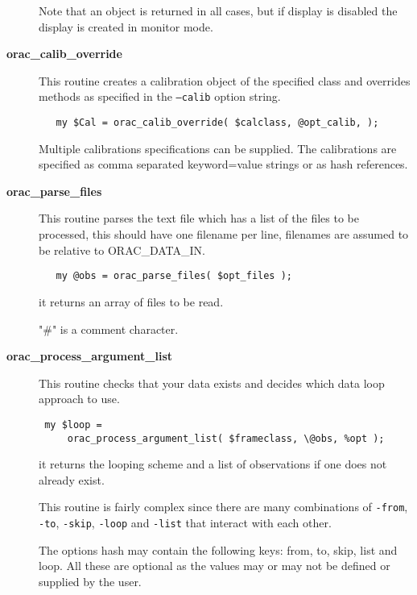 \begin{description}
Note that an object is returned in all cases, but if display
is disabled the display is created in monitor mode.


\item[{\textbf{orac\_calib\_override}}] \mbox{}

This routine creates a calibration object of the specified class and
overrides methods as specified in the \texttt{--calib} option string.

\begin{verbatim}
   my $Cal = orac_calib_override( $calclass, @opt_calib, );
\end{verbatim}


Multiple calibrations specifications can be supplied.
The calibrations are specified as comma separated keyword=value strings
or as hash references.


\item[{\textbf{orac\_parse\_files}}] \mbox{}

This routine parses the text file which has a list of the files to be
processed, this should have one filename per line, filenames are
assumed to be relative to ORAC\_DATA\_IN.

\begin{verbatim}
   my @obs = orac_parse_files( $opt_files );
\end{verbatim}


it returns an array of files to be read.



"\#" is a comment character.


\item[{\textbf{orac\_process\_argument\_list}}] \mbox{}

This routine checks that your data exists and decides which data
loop approach to use.

\begin{verbatim}
 my $loop =
     orac_process_argument_list( $frameclass, \@obs, %opt );
\end{verbatim}


it returns the looping scheme and a list of observations if one does not
already exist.



This routine is fairly complex since there are many combinations of
\texttt{-from}, \texttt{-to}, \texttt{-skip}, \texttt{-loop} and \texttt{-list} that interact with
each other.



The options hash may contain the following keys: from, to, skip,
list and loop. All these are optional as the values may or may
not be defined or supplied by the user.



\end{description}
